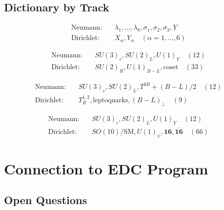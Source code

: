 \documentclass[11pt,a4paper]{article}
\begin{document}
\subsection{Dictionary by Track}

\begin{resultbox}[SU(5) BC Dictionary]
\begin{align}
\text{Neumann:} \quad & \lambda_1, \ldots, \lambda_8, \sigma_1, \sigma_2, \sigma_3, Y \\
\text{Dirichlet:} \quad & X_\alpha, Y_\alpha \quad (\alpha = 1, \ldots, 6)
\end{align}
\end{resultbox}

\begin{resultbox}[SO(10) BC Dictionary]
\begin{align}
\text{Neumann:} \quad & SU(3)_c, SU(2)_L, U(1)_Y \quad (12) \\
\text{Dirichlet:} \quad & SU(2)_R, U(1)_{B-L}, \text{coset} \quad (33)
\end{align}
\end{resultbox}

\begin{resultbox}[PS BC Dictionary]
\begin{align}
\text{Neumann:} \quad & SU(3)_c, SU(2)_L, T^{3R} + (B-L)/2 \quad (12) \\
\text{Dirichlet:} \quad & T^{1,2}_R, \text{leptoquarks}, (B-L)_\perp \quad (9)
\end{align}
\end{resultbox}

\begin{resultbox}[$E_6$ BC Dictionary]
\begin{align}
\text{Neumann:} \quad & SU(3)_c, SU(2)_L, U(1)_Y \quad (12) \\
\text{Dirichlet:} \quad & SO(10)/\text{SM}, U(1)_\psi, \mathbf{16}, \overline{\mathbf{16}} \quad (66)
\end{align}
\end{resultbox}

\section{Connection to EDC Program}

\subsection{Open Questions}
\end{document}
